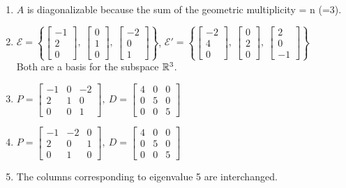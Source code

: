 \begin{SaveQuestion}
\begin{enumerate}
            \item $A$ is diagonalizable because the sum of the geometric multiplicity = n (=3).
			\item $\mathcal E = \left\{\begin{bmatrix}
			-1\\2\\0
			\end{bmatrix},\ \begin{bmatrix}
			0\\1\\0
			\end{bmatrix},\ \begin{bmatrix}
			-2\\0\\1
			\end{bmatrix}\right\}$, $\mathcal E' = \left\{\begin{bmatrix}
			-2\\4\\0
			\end{bmatrix},\ \begin{bmatrix}
			0\\2\\0
			\end{bmatrix},\ \begin{bmatrix}
			2\\0\\-1
			\end{bmatrix}\right\}$ \\
            Both are a basis for the subspace $\mathbb{R}^3$.
			\item $P = \begin{bmatrix}
			-1&0&-2\\2&1&0\\0&0&1
			\end{bmatrix},\ D = \begin{bmatrix}
			4&0&0\\0&5&0\\0&0&5
			\end{bmatrix}$
			\item $P = \begin{bmatrix}
			-1&-2&0\\2&0&1\\0&1&0
			\end{bmatrix},\ D = \begin{bmatrix}
			4&0&0\\0&5&0\\0&0&5
			\end{bmatrix}$
			\item The columns corresponding to eigenvalue 5 are interchanged.
		\end{enumerate}	
\end{SaveQuestion}


